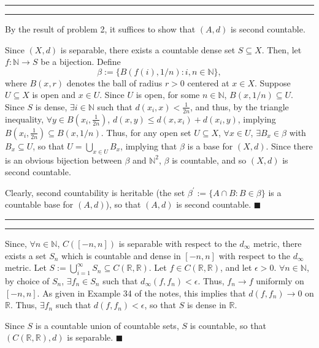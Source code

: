 \documentclass[11pt]{article}
\newcounter{questionCounter}
\newcounter{partCounter}[questionCounter]
\newenvironment{question}[2][\arabic{questionCounter}]{%
    \setcounter{partCounter}{0}%
    \vspace{.25in} \hrule \vspace{0.5em}%
        \noindent{\bf #2}%
    \vspace{0.8em} \hrule \vspace{.10in}%
    \addtocounter{questionCounter}{1}%
}{}
\renewcommand{\qed}{\quad $\blacksquare$}
\newcommand{\N}{\mathbb{N}} %
\newcommand{\R}{\mathbb{R}} %
\begin{document}
\begin{question}{Problem 3}
By the result of problem 2, it suffices to show that $(A,d)$ is second
countable.

Since $(X,d)$ is separable, there exists a countable dense set
$S \subseteq X$. Then, let $f: \N \rightarrow S$ be a bijection. Define
\[\beta := \{B(f(i),1/n) : i,n \in \N\},\] where $B(x,r)$ denotes the
ball of radius $r > 0$ centered at $x \in X$. Suppose $U \subseteq X$ is open
and $x \in U$. Since $U$ is open, for some $n \in \N$, $B(x,1/n) \subseteq U$.
Since $S$ is dense, $\exists i \in \N$ such that $d(x_i,x) < \frac{1}{2n}$,
and thus, by the triangle inequality, $\forall y \in B(x_i,\tfrac{1}{2n})$,
$d(x,y) \leq d(x,x_i) + d(x_i,y)$, implying
$B(x_i,\tfrac{1}{2n}) \subseteq B(x,1/n)$. Thus, for any open set
$U \subseteq X$, $\forall x \in U$, $\exists B_x \in \beta$ with
$B_x \subseteq U$,
so that $U = \bigcup_{x \in U} B_x$, implying that $\beta$ is a base for
$(X,d)$. Since there is an obvious bijection between $\beta$ and $\N^2$,
$\beta$ is countable, and so $(X,d)$ is second countable.

Clearly, second countability is heritable (the set
$\beta^{\prime} := \{A \cap B : B \in \beta\}$ is a countable base
for $(A,d)$), so that $(A,d)$ is second countable. \qed
\end{question}

\begin{question}{Problem 4}
Since, $\forall n \in \N$, $C([-n,n])$ is separable with respect to the
$d_{\infty}$ metric, there exists a set $S_n$ which is countable and dense in
$[-n,n]$ with respect to the $d_{\infty}$ metric. Let $S := \bigcup_{i = 1}^{\infty} S_n \subseteq C(\R,\R)$.
Let $f \in C(\R,\R)$, and let $\epsilon > 0$. $\forall n \in \N$,
by choice of $S_n$, $\exists f_n \in S_n$ such that
$d_{\infty}(f, f_n) < \epsilon$. Thus, $f_n \rightarrow f$ uniformly on
$[-n,n]$. As given in Example 34 of the notes, this implies that
$d(f, f_n) \rightarrow 0$ on $\R$. Thus, $\exists f_n$ such that
$d(f, f_n) < \epsilon$, so that $S$ is dense in $\R$.

Since $S$ is a countable union of countable sets, $S$ is countable, so that
$(C(\R,\R),d)$ is separable. \qed
\end{question}
\end{document}
